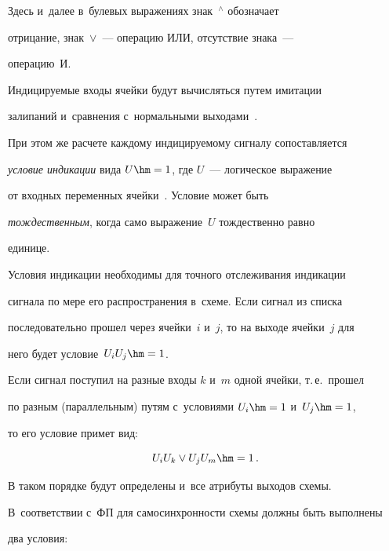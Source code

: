    


   Здесь и~далее в~булевых выражениях знак~${}^\wedge$ обозначает 


отрицание, знак~$\vee$~--- операцию ИЛИ, отсутствие знака~--- 


операцию~И.


   


   Индицируемые входы ячейки будут вычисляться путем имитации 


залипаний и~сравнения с~нормальными выходами~\cite{5-ple}.


   


   При этом же расчете каждому индицируемому сигналу сопоставляется 


\textit{условие индикации} вида $U\hm = 1$, где $U$~--- логическое выражение 


от входных переменных ячейки~\cite{5-ple}. Условие может быть 


\textit{тождественным}, когда само выражение~$U$ тождественно равно 


единице.


   


   Условия индикации необходимы для точного отслеживания индикации 


сигнала по мере его распространения в~схеме. Если сигнал из списка 


последовательно прошел через ячейки~$i$ и~$j$, то на выходе ячейки~$j$ для 


него будет условие~$U_iU_j\hm=1$.


   


   Если сигнал поступил на разные входы $k$ и~$m$ одной ячейки, т.\,е.\ прошел 


по разным (параллельным) путям с~условиями $U_i\hm = 1$ и~$U_j\hm = 1$, 


то его условие примет вид: 


$$


U_i U_k \vee U_j U_m\hm=1\,.


$$


   


   В таком порядке будут определены и~все атрибуты выходов схемы. 


В~соответствии с~ФП для самосинхронности схемы должны быть выполнены 


два условия:


